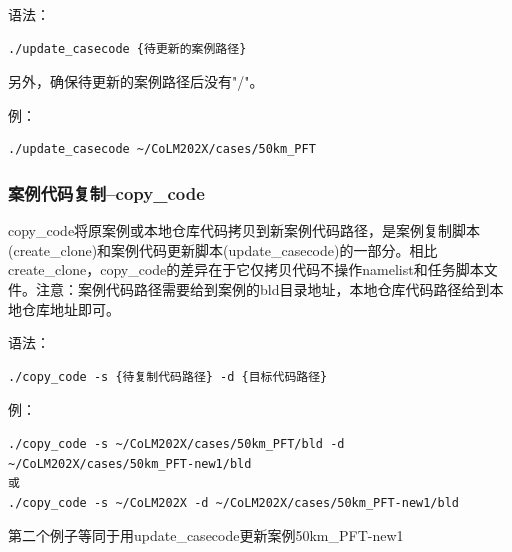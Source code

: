 语法：
\begin{lstlisting}
./update_casecode {待更新的案例路径}
\end{lstlisting}
另外，确保待更新的案例路径后没有"/"。

例：
\begin{lstlisting}
./update_casecode ~/CoLM202X/cases/50km_PFT
\end{lstlisting}


\subsubsection{案例代码复制--copy\_code}
copy\_code将原案例或本地仓库代码拷贝到新案例代码路径，是案例复制脚本(create\_clone)和案例代码更新脚本(update\_casecode)的一部分。相比create\_clone，copy\_code的差异在于它仅拷贝代码不操作namelist和任务脚本文件。注意：案例代码路径需要给到案例的bld目录地址，本地仓库代码路径给到本地仓库地址即可。

语法：
\begin{lstlisting}
./copy_code -s {待复制代码路径} -d {目标代码路径}
\end{lstlisting}

例：
\begin{lstlisting}
./copy_code -s ~/CoLM202X/cases/50km_PFT/bld -d ~/CoLM202X/cases/50km_PFT-new1/bld
或
./copy_code -s ~/CoLM202X -d ~/CoLM202X/cases/50km_PFT-new1/bld
\end{lstlisting}
第二个例子等同于用update\_casecode更新案例50km\_PFT-new1

\clearpage
